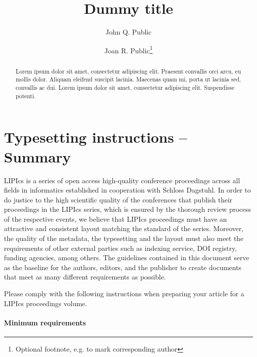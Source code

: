 \documentclass[a4paper,UKenglish,cleveref, autoref]{lipics-v2019}
\title{Dummy title} %
\author{John Q. Public}{Dummy University Computing Laboratory, [optional: Address], Country \and My second affiliation, Country \and \url{http://www.myhomepage.edu} }{johnqpublic@dummyuni.org}{https://orcid.org/0000-0002-1825-0097}{(Optional) author-specific funding acknowledgements}%
\author{Joan R. Public\footnote{Optional footnote, e.g. to mark corresponding author}}{Department of Informatics, Dummy College, [optional: Address], Country}{joanrpublic@dummycollege.org}{[orcid]}{[funding]}
\begin{document}
\maketitle

\begin{abstract}
Lorem ipsum dolor sit amet, consectetur adipiscing elit. Praesent convallis orci arcu, eu mollis dolor. Aliquam eleifend suscipit lacinia. Maecenas quam mi, porta ut lacinia sed, convallis ac dui. Lorem ipsum dolor sit amet, consectetur adipiscing elit. Suspendisse potenti. 
\end{abstract}

\section{Typesetting instructions -- Summary}
\label{sec:typesetting-summary}

LIPIcs is a series of open access high-quality conference proceedings across all fields in informatics established in cooperation with Schloss Dagstuhl. 
In order to do justice to the high scientific quality of the conferences that publish their proceedings in the LIPIcs series, which is ensured by the thorough review process of the respective events, we believe that LIPIcs proceedings must have an attractive and consistent layout matching the standard of the series.
Moreover, the quality of the metadata, the typesetting and the layout must also meet the requirements of other external parties such as indexing service, DOI registry, funding agencies, among others. The guidelines contained in this document serve as the baseline for the authors, editors, and the publisher to create documents that meet as many different requirements as possible. 

Please comply with the following instructions when preparing your article for a LIPIcs proceedings volume. 
\paragraph*{Minimum requirements}
\end{document}
